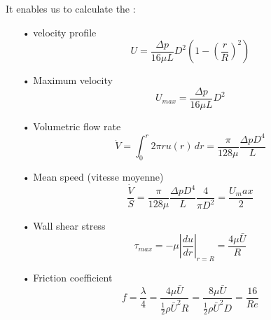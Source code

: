 		It enables us to calculate the :
		\begin{itemize}
			\item[•] velocity profile
			\begin{equation}
				U = \frac{\Delta p}{16\mu L}D^2 \left(1-\left(\frac{r}{R}\right)^2 \right)
			\end{equation}
			
			\item[•] Maximum velocity 
			\begin{equation}
				U_{max} = \frac{\Delta p}{16 \mu L }D^2
			\end{equation}
			
			\item[•] Volumetric flow rate
			\begin{equation}
				\dot{V} = \int _0 ^r 2\pi r u(r) \, dr = \frac{\pi}{128 \mu} \frac{\Delta p D^4}{L}
			\end{equation}
			
			\item[•] Mean speed (vitesse moyenne)
			\begin{equation}
				\frac{\dot{V}}{S} = \frac{\pi}{128 \mu} \frac{\Delta p D^4}{L} \frac{4}{\pi D^2} = \frac{U_max}{2}
			\end{equation}
			
			\item[•] Wall shear stress
			\begin{equation}
				\tau _{max} = -\mu |\frac{du}{dr}| _{r=R} = \frac{4 \mu \bar{U}}{R}
			\end{equation}
			
			\item[•] Friction coefficient
			\begin{equation}
				f = \frac{\lambda}{4} = \frac{4 \mu \bar{U}}{\frac{1}{2}\rho \bar{U}^2 R} = \frac{8 \mu \bar{U}}{\frac{1}{2}\rho \bar{U}^2 D} = \frac{16}{Re}
			\end{equation}
		\end{itemize}
		

